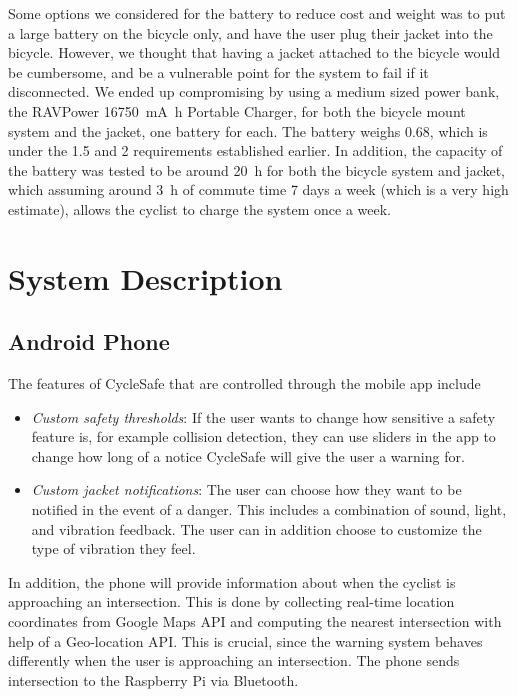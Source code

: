 \documentclass[journal]{IEEEtran}
\begin{document}
Some options we considered for the battery to reduce cost and weight was to put a large battery on the bicycle only, and have the user plug their jacket into the bicycle. However, we thought that having a jacket attached to the bicycle would be cumbersome, and be a vulnerable point for the system to fail if it disconnected. We ended up compromising by using a medium sized power bank, the RAVPower \SI{16750}{\milli\ampere\hour} Portable Charger, for both the bicycle mount system and the jacket, one battery for each. The battery weighs \SI{0.68}{\lb}, which is under the \SI{1.5}{\lb} and \SI{2}{\lb} requirements established earlier. In addition, the capacity of the battery was tested to be around \SI{20}{\hour} for both the bicycle system and jacket, which assuming around \SI{3}{\hour} of commute time 7 days a week (which is a very high estimate), allows the cyclist to charge the system once a week.

\section{System Description}
\subsection{Android Phone}
The features of CycleSafe that are controlled through the mobile app include
\begin{itemize}
    \item \textit{Custom safety thresholds}: If the user wants to change how sensitive a safety feature is, for example collision detection, they can use sliders in the app to change how long of a notice CycleSafe will give the user a warning for.
    
    \item \textit{Custom jacket notifications}: The user can choose how they want to be notified in the event of a danger. This includes a combination of sound, light, and vibration feedback. The user can in addition choose to customize the type of vibration they feel.
\end{itemize}
In addition, the phone will provide information about when the cyclist is approaching an intersection. This is done by collecting real-time location coordinates from Google Maps API and computing the nearest intersection with help of a Geo-location API.  This is crucial, since the warning system behaves differently when the user is approaching an intersection. The phone sends intersection to the Raspberry Pi via Bluetooth.
\end{document}

